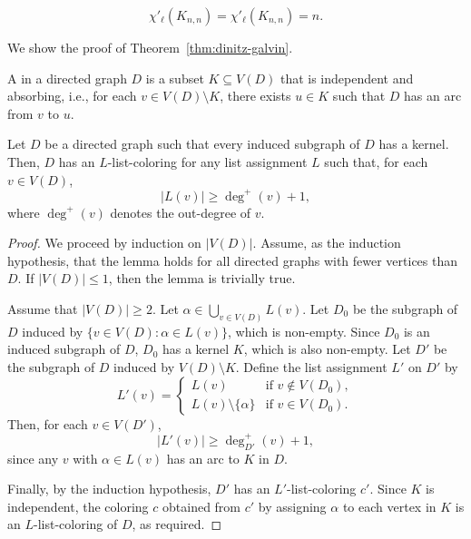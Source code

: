 \begin{theorem}
    \label{thm:dinitz-galvin}
    \begin{equation}
        \chi'_\ell(K_{n, n}) = \chi'_\ell(K_{n, n}) = n.
    \end{equation}
\end{theorem}

We show the proof of Theorem~\ref{thm:dinitz-galvin}.

\begin{definition}[Kernel]
    A  in a directed graph \(D\) is
    a subset \(K \subseteq V(D)\) that is
    independent and
    absorbing, i.e.,
    for each \(v \in V(D) \setminus K\),
    there exists \(u \in K\) such that
    \(D\) has an arc from \(v\) to \(u\).
\end{definition}

\begin{lemma} \label{lem:bondy-boppana-segal}
    Let \(D\) be a directed graph such that
    every induced subgraph of \(D\) has a kernel.
    Then, \(D\) has an \(L\)-list-coloring
    for any list assignment \(L\)
    such that, for each \(v \in V(D)\),
    \begin{equation}
        |L(v)| \geq \deg^+(v) + 1,
    \end{equation}
    where \(\deg^+(v)\) denotes the out-degree of \(v\).
\end{lemma}

\begin{proof}
    We proceed by induction on \(|V(D)|\).
    Assume,
    as the induction hypothesis,
    that the lemma holds for all directed graphs with fewer vertices than \(D\).
    If \(|V(D)| \leq 1\), then the lemma is trivially true.

    Assume that \(|V(D)| \geq 2\).
    Let \(\alpha \in \bigcup_{v \in V(D)} L(v)\).
    Let \(D_0\) be the subgraph of \(D\) induced by \(\{v \in V(D) : \alpha \in L(v)\}\),
    which is non-empty.
    Since \(D_0\) is an induced subgraph of \(D\), \(D_0\) has a kernel \(K\), which is also non-empty.
    Let \(D'\) be the subgraph of \(D\) induced by \(V(D) \setminus K\).
    Define the list assignment \(L'\) on \(D'\) by
    \begin{equation}
        L'(v) = \begin{cases}
            L(v) & \text{if } v \notin V(D_0), \\
            L(v) \setminus \{\alpha\} & \text{if } v \in V(D_0).
        \end{cases}
    \end{equation}
    Then, for each \(v \in V(D')\),
    \begin{equation}
        |L'(v)| \geq \deg^+_{D'}(v) + 1,
    \end{equation}
    since any \(v\) with \(\alpha \in L(v)\) has an arc to \(K\) in \(D\).

    Finally, by the induction hypothesis,
    \(D'\) has an \(L'\)-list-coloring \(c'\).
    Since \(K\) is independent,
    the coloring \(c\) obtained from \(c'\)
    by assigning \(\alpha\) to each vertex in \(K\)
    is an \(L\)-list-coloring of \(D\), as required.
\end{proof}

